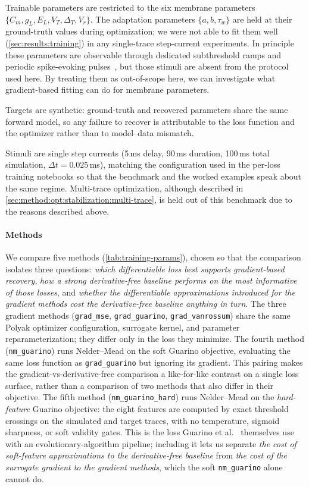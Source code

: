 Trainable parameters are restricted to the six membrane parameters $\{C_m, g_L, E_L, V_T, \Delta_T, V_r\}$.
The adaptation parameters $\{a, b, \tau_w\}$ are held at their ground-truth values during optimization;
we were not able to fit them well (\cref{sec:results:training}) in any single-trace step-current experiments.
In principle these parameters are observable through dedicated subthreshold ramps and periodic spike-evoking pulses~\cite{Brette2005}, but those stimuli are absent from the protocol used here.
By treating them as out-of-scope here, we can investigate what gradient-based fitting can do for membrane parameters.

Targets are synthetic: ground-truth and recovered parameters share the same forward model, so any failure to recover is attributable to the loss function and the optimizer rather than to model--data mismatch.

Stimuli are single step currents (5\,ms delay, 90\,ms duration, 100\,ms total simulation, $\Delta t = 0.025$\,ms), matching the configuration used in the per-loss training notebooks so that the benchmark and the worked examples speak about the same regime.
Multi-trace optimization, although described in \cref{sec:method:opt:stabilization:multi-trace}, is held out of this benchmark due to the reasons described above.

\paragraph{Methods}\label{sec:method:opt:recovery-benchmark:methods}
We compare five methods (\cref{tab:training-params}), chosen so that the comparison isolates three questions: \emph{which differentiable loss best supports gradient-based recovery}, \emph{how a strong derivative-free baseline performs on the most informative of those losses}, and \emph{whether the differentiable approximations introduced for the gradient methods cost the derivative-free baseline anything in turn}.
The three gradient methods (\texttt{grad\_mse}, \texttt{grad\_guarino}, \texttt{grad\_vanrossum}) share the same Polyak optimizer configuration, surrogate kernel, and parameter reparameterization;
they differ only in the loss they minimize.
The fourth method (\texttt{nm\_guarino}) runs Nelder--Mead on the soft Guarino objective, evaluating the same loss function as \texttt{grad\_guarino} but ignoring its gradient.
This pairing makes the gradient-vs-derivative-free comparison a like-for-like contrast on a single loss surface, rather than a comparison of two methods that also differ in their objective.
The fifth method (\texttt{nm\_guarino\_hard}) runs Nelder--Mead on the \emph{hard-feature} Guarino objective: the eight features are computed by exact threshold crossings on the simulated and target traces, with no temperature, sigmoid sharpness, or soft validity gates.
This is the loss Guarino et al.~\cite{Guarino2025} themselves use with an evolutionary-algorithm pipeline;
including it lets us separate \emph{the cost of soft-feature approximations to the derivative-free baseline} from \emph{the cost of the surrogate gradient to the gradient methods}, which the soft \texttt{nm\_guarino} alone cannot do.

